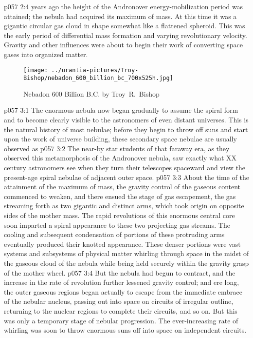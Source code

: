 \vs p057 2:4 \pc {} years ago the height of the Andronover energy\hyp{}mobilization period was attained; the nebula had acquired its maximum of mass. At this time it was a gigantic circular gas cloud in shape somewhat like a flattened spheroid. This was the early period of differential mass formation and varying revolutionary velocity. Gravity and other influences were about to begin their work of converting space gases into organized matter.
\begin{figure}[H]
\centering
\texttt{[image: ../urantia-pictures/Troy-Bishop/nebadon\_600\_billion\_bc\_700x525h.jpg]}
\caption{Nebadon 600 Billion B.C. by Troy~R.~Bishop}
\end{figure}
\vs p057 3:1 The enormous nebula now began gradually to assume the spiral form and to become clearly visible to the astronomers of even distant universes. This is the natural history of most nebulae; before they begin to throw off suns and start upon the work of universe building, these secondary space nebulae are usually observed as 
\vs p057 3:2 The near\hyp{}by star students of that faraway era, as they observed this metamorphosis of the Andronover nebula, saw exactly what XX century astronomers see when they turn their telescopes spaceward and view the present\hyp{}age spiral nebulae of adjacent outer space.
\vs p057 3:3 About the time of the attainment of the maximum of mass, the gravity control of the gaseous content commenced to weaken, and there ensued the stage of gas escapement, the gas streaming forth as two gigantic and distinct arms, which took origin on opposite sides of the mother mass. The rapid revolutions of this enormous central core soon imparted a spiral appearance to these two projecting gas streams. The cooling and subsequent condensation of portions of these protruding arms eventually produced their knotted appearance. These denser portions were vast systems and subsystems of physical matter whirling through space in the midst of the gaseous cloud of the nebula while being held securely within the gravity grasp of the mother wheel.
\vs p057 3:4 But the nebula had begun to contract, and the increase in the rate of revolution further lessened gravity control; and ere long, the outer gaseous regions began actually to escape from the immediate embrace of the nebular nucleus, passing out into space on circuits of irregular outline, returning to the nuclear regions to complete their circuits, and so on. But this was only a temporary stage of nebular progression. The ever\hyp{}increasing rate of whirling was soon to throw enormous suns off into space on independent circuits.

